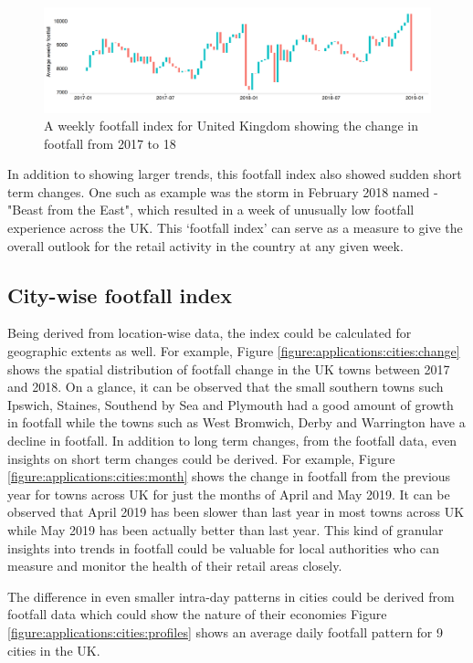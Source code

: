 \begin{figure}
  \includegraphics[trim={0 25 0 10},clip]{images/applications-footfall-index.png}
  \caption{A weekly footfall index for United Kingdom showing the change in footfall from 2017 to 18}
  \label{figure:applications:footfall:index}
\end{figure}

In addition to showing larger trends, this footfall index also showed sudden short term changes. 
One such as example was the storm in February 2018 named - "Beast from the East", which resulted in a week of unusually low footfall experience across the UK.
This `footfall index' can serve as a measure to give the overall outlook for the 
retail activity in the country at any given week.

\subsection{City-wise footfall index}

Being derived from location-wise data, the index could be calculated for geographic extents as well.
For example, Figure \ref{figure:applications:cities:change} shows the spatial distribution of footfall change in the UK towns between 2017 and 2018.
On a glance, it can be observed that the small southern towns such Ipswich, Staines, Southend by Sea and Plymouth had a good amount of growth in footfall while the towns such as West Bromwich, Derby and Warrington have a decline in footfall.
In addition to long term changes, from the footfall data, even insights on short term changes could be derived.
For example, Figure \ref{figure:applications:cities:month} shows the change in footfall from the previous year for towns across UK for just the months of April and May 2019.
It can be observed that April 2019 has been slower than last year in most towns across UK while May 2019 has been actually better than last year.
This kind of granular insights into trends in footfall could be valuable for local authorities who can measure and monitor the health of their retail areas closely.

The difference in even smaller intra-day patterns in cities could be derived from footfall data which could show the nature of their economies
Figure \ref{figure:applications:cities:profiles} shows an average daily footfall pattern for 9 cities in the UK.

